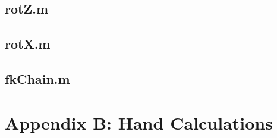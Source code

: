 \documentclass[11pt]{article}
\begin{document}
\subsection*{rotZ.m}

\newpage
\subsection*{rotX.m}

\newpage
\subsection*{fkChain.m}

\newpage
\section*{Appendix B: Hand Calculations}\label{app:hand}


\end{document}
